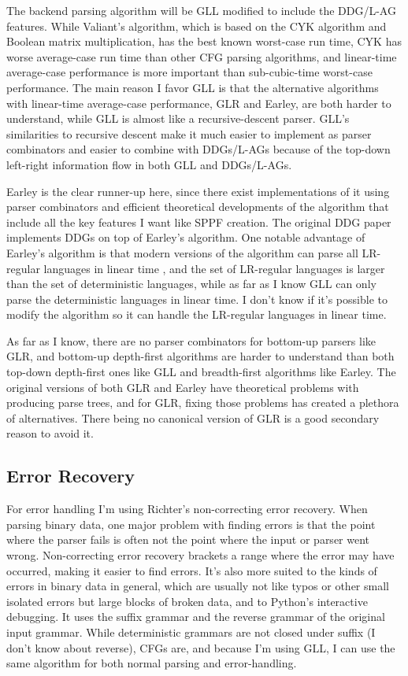 \documentclass[12pt]{article}
\begin{document}
The backend parsing algorithm will be GLL modified to include the
DDG/L-AG features.  While Valiant's algorithm, which is based on the
CYK algorithm and Boolean matrix multiplication, has the best known
worst-case run time, CYK has worse average-case run time than other
CFG parsing algorithms, and linear-time average-case performance is
more important than sub-cubic-time worst-case performance.  The main
reason I favor GLL is that the alternative algorithms with linear-time
average-case performance, GLR and Earley, are both harder to
understand, while GLL is almost like a recursive-descent parser.
GLL's similarities to recursive descent make it much easier to
implement as parser combinators and easier to combine with DDGs/L-AGs
because of the top-down left-right information flow in both GLL and
DDGs/L-AGs.

Earley is the clear runner-up here, since there exist implementations
of it using parser combinators and efficient theoretical developments
of the algorithm that include all the key features I want like SPPF
creation.  The original DDG paper \textcite{yakker1} implements DDGs
on top of Earley's algorithm.  One notable advantage of Earley's
algorithm is that modern versions of the algorithm can parse all
LR-regular languages in linear time \parencite{marpa}, and the set of
LR-regular languages is larger than the set of deterministic
languages\parencite{lr-regular}, while as far as I know GLL can only
parse the deterministic languages in linear time.  I don't know if
it's possible to modify the algorithm so it can handle the LR-regular
languages in linear time.

As far as I know, there are no parser combinators for bottom-up
parsers like GLR, and bottom-up depth-first algorithms are harder to
understand than both top-down depth-first ones like GLL and
breadth-first algorithms like Earley.  The original versions of both
GLR and Earley have theoretical problems with producing parse trees,
and for GLR, fixing those problems has created a plethora of
alternatives.  There being no canonical version of GLR is a good
secondary reason to avoid it.


\subsection{Error Recovery}
\label{sec:errors}


For error handling I'm using Richter's non-correcting error recovery.
When parsing binary data, one major problem with finding errors is
that the point where the parser fails is often not the point where the
input or parser went wrong.  Non-correcting error recovery brackets a
range where the error may have occurred, making it easier to find
errors.  It's also more suited to the kinds of errors in binary data
in general, which are usually not like typos or other small isolated
errors but large blocks of broken data, and to Python's interactive
debugging.  It uses the suffix grammar and the reverse grammar of the
original input grammar.  While deterministic grammars are not closed
under suffix (I don't know about reverse), CFGs are, and because I'm
using GLL, I can use the same algorithm for both normal parsing and
error-handling.
\end{document}
